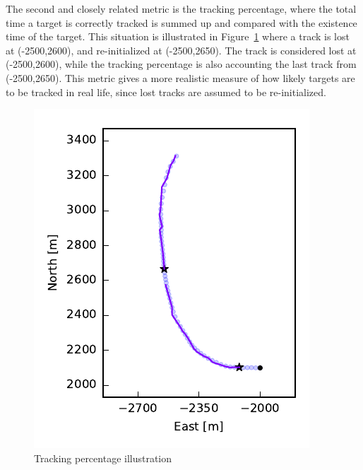 The second and closely related metric is the tracking percentage, where the total time a target is correctly tracked is summed up and compared with the existence time of the target. This situation is illustrated in Figure~\ref{fig:track_percentage} where a track is lost at (-2500,2600), and re-initialized at (-2500,2650). The track is considered lost at (-2500,2600), while the tracking percentage is also accounting the last track from (-2500,2650). This metric gives a more realistic measure of how likely targets are to be tracked in real life, since lost tracks are assumed to be re-initialized. 


\begin{figure}
\centering
\includegraphics{Figures/plots/TrackingPercentageExample.pdf}
\caption{Tracking percentage illustration}\label{fig:track_percentage}
\end{figure}


